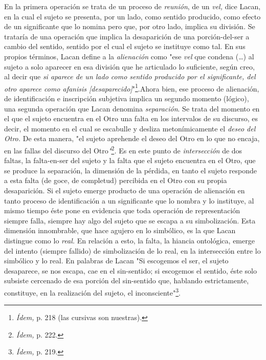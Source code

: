 \documentclass{book}
\begin{document}
En la primera operación se trata de un proceso de \emph{reunión}, de un
\emph{vel,} dice Lacan, en la cual el sujeto se presenta, por un lado,
como sentido producido, como efecto de un significante que lo nomina
pero que, por otro lado, implica su división\emph{.} Se trataría de una
operación que implica la desaparición de una porción-del-ser a cambio
del sentido, sentido por el cual el sujeto se instituye como tal. En sus
propios términos, Lacan define a la \emph{alienación} como "ese
\emph{vel} que condena (\dots) al sujeto a solo aparecer en esa
división que he articulado lo suficiente, según creo, al decir que
\emph{si aparece de un lado como sentido producido por el significante,
del otro aparece como afanisis {[}desaparecido{]}}"\footnote{\emph{Ídem,}
  p. 218 (las cursivas son nuestras).}.Ahora bien, ese proceso de
alienación, de identificación e inscripción subjetiva implica un segundo
momento (lógico), una segunda operación que Lacan denomina
\emph{separación}. Se trata del momento en el que el sujeto encuentra en
el Otro una falta en los intervalos de su discurso, es decir, el momento
en el cual se escabulle y desliza metonímicamente el \emph{deseo del
Otro.} De esta manera, "el sujeto aprehende el deseo del Otro en lo que
no encaja, en las fallas del discurso del
Otro\emph{"}\footnote{\emph{Ídem,} p. 222.}\emph{.} Es en este punto de
\emph{intersección} de dos faltas, la falta-en-ser del sujeto y la falta
que el sujeto encuentra en el Otro, que se produce la separación, la
dimensión de la pérdida, en tanto el sujeto responde a esta falta (de
goce, de completud) percibida en el Otro con su propia desaparición. Si
el sujeto emerge producto de una operación de alienación en tanto
proceso de identificación a un significante que lo nombra y lo
instituye, al mismo tiempo éste pone en evidencia que toda operación de
representación siempre falla, siempre hay algo del sujeto que se escapa
a su simbolización. Esta dimensión innombrable, que hace agujero en lo
simbólico, es la que Lacan distingue como lo \emph{real.} En relación a
esto, la falta, la hiancia ontológica, emerge del intento (siempre
fallido) de simbolización de lo real, en la intersección entre lo
simbólico y lo real. En palabras de Lacan "Si escogemos el ser, el
sujeto desaparece, se nos escapa, cae en el sin-sentido; si escogemos el
sentido, éste solo subsiste cercenado de esa porción del sin-sentido
que, hablando estrictamente, constituye, en la realización del sujeto,
el inconsciente"\footnote{\emph{Ídem,} p. 219.}.
\end{document}

